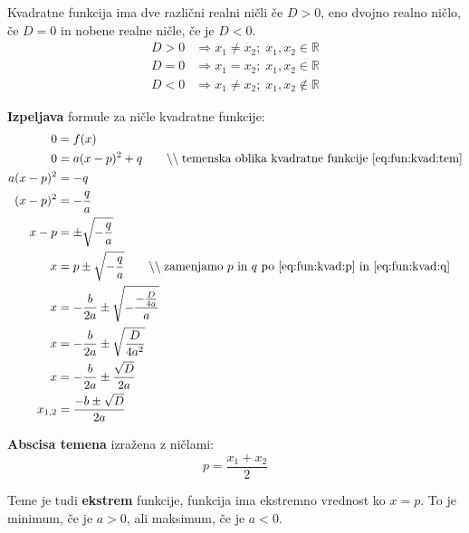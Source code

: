 \documentclass[a4paper,oneside,12pt,fleqn]{article}
\def\R{\ensuremath{\mathbb R}}
\newcommand{\comment}[1]{\ensuremath{\qquad\backslash\backslash\;}\textnormal{#1}}
\renewcommand\implies\Rightarrow
\numberwithin{equation}{section}
\begin{document}
Kvadratne funkcija ima dve različni realni ničli če $D > 0$, eno dvojno realno ničlo, če
$D = 0$ in nobene realne ničle, če je $D < 0$.
\begin{align*}
  D > 0 &\implies x_1 \neq x_2; \; x_1, x_2 \in \R \\
  D = 0 &\implies x_1 = x_2; \; x_1, x_2 \in \R \\
  D < 0 &\implies x_1 \neq x_2; \; x_1, x_2 \notin \R
\end{align*}

\textbf{Izpeljava} formule za ničle kvadratne funkcije:
\begin{align*}
  0 &= f(x) \\
  0 &= a(x-p)^2 + q \comment{temenska oblika kvadratne funkcije \eqref{eq:fun:kvad:tem}} \\
  a(x-p)^2 &= -q \\
  (x-p)^2 &= -\frac{q}{a} \\
  x-p &= \pm \sqrt{-\frac{q}{a}} \\
  x &= p \pm \sqrt{-\frac{q}{a}} \comment{zamenjamo $p$ in $q$ po
  \eqref{eq:fun:kvad:p} in \eqref{eq:fun:kvad:q}} \\
  x &= - \frac{b}{2a} \pm \sqrt{-\frac{-\frac{D}{4a}}{a}} \\
  x &= - \frac{b}{2a} \pm \sqrt{\frac{D}{4a^2}} \\
  x &= - \frac{b}{2a} \pm \frac{\sqrt{D}}{2a} \\
  x_{1,2} &= \frac{-b \pm \sqrt{D}}{2a}
\end{align*}

\textbf{Abscisa temena} izražena z ničlami:
\[ p = \frac{x_1+x_2}{2} \]

Teme je tudi \textbf{ekstrem} funkcije, funkcija ima ekstremno vrednost ko $x = p$. To je
minimum, če je $a > 0$, ali maksimum, če je $a < 0$.
\end{document}
